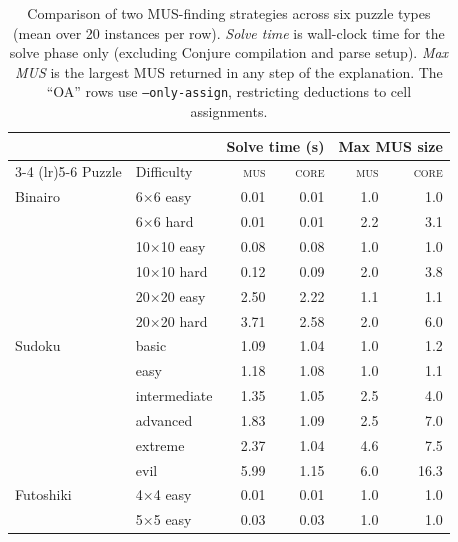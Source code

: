 

\begin{table}[t]
\centering
\caption{Comparison of two MUS-finding strategies across six puzzle
  types (mean over 20 instances per row).  \emph{Solve time} is
  wall-clock time for the solve phase only (excluding Conjure
  compilation and parse setup).  \emph{Max MUS} is the largest MUS
  returned in any step of the explanation.  The ``OA'' rows use
  \texttt{--only-assign}, restricting deductions to cell assignments.}
\label{tab:mus-comparison}
\small
\begin{tabular}{@{}ll rr rr@{}}
\toprule
 & & \multicolumn{2}{c}{Solve time (s)}
 & \multicolumn{2}{c}{Max MUS size} \\
\cmidrule(lr){3-4} \cmidrule(lr){5-6}
Puzzle & Difficulty
 & \textsc{mus} & \textsc{core}
 & \textsc{mus} & \textsc{core} \\
\midrule
Binairo
  & 6$\times$6 easy    & 0.01 & 0.01  &  1.0 &  1.0 \\
  & 6$\times$6 hard    & 0.01 & 0.01  &  2.2 &  3.1 \\
  & 10$\times$10 easy  & 0.08 & 0.08  &  1.0 &  1.0 \\
  & 10$\times$10 hard  & 0.12 & 0.09  &  2.0 &  3.8 \\
  & 20$\times$20 easy  & 2.50 & 2.22  &  1.1 &  1.1 \\
  & 20$\times$20 hard  & 3.71 & 2.58  &  2.0 &  6.0 \\
\addlinespace
Sudoku
  & basic              & 1.09 & 1.04  &  1.0 &  1.2 \\
  & easy               & 1.18 & 1.08  &  1.0 &  1.1 \\
  & intermediate       & 1.35 & 1.05  &  2.5 &  4.0 \\
  & advanced           & 1.83 & 1.09  &  2.5 &  7.0 \\
  & extreme            & 2.37 & 1.04  &  4.6 &  7.5 \\
  & evil               & 5.99 & 1.15  &  6.0 & 16.3 \\
\addlinespace
Futoshiki
  & 4$\times$4 easy    & 0.01 & 0.01  &  1.0 &  1.0 \\
  & 5$\times$5 easy    & 0.03 & 0.03  &  1.0 &  1.0 \\

\end{tabular}
\end{table}
